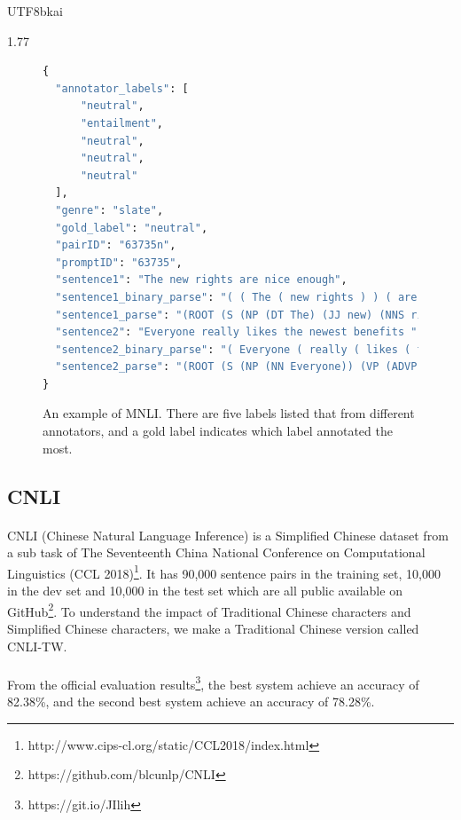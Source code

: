 \documentclass[12pt]{article}
\begin{document}
\begin{CJK*}{UTF8}{bkai}
\begin{spacing}{1.77}
\begin{figure}
\caption[An example of MNLI]{An example of MNLI. There are five labels listed that from different annotators, and a gold label indicates which label annotated the most.}
\begin{minipage}{\linewidth}
\begin{lstlisting}[language=Python]
{
  "annotator_labels": [
      "neutral",
      "entailment",
      "neutral",
      "neutral",
      "neutral"
  ],
  "genre": "slate",
  "gold_label": "neutral",
  "pairID": "63735n",
  "promptID": "63735",
  "sentence1": "The new rights are nice enough",
  "sentence1_binary_parse": "( ( The ( new rights ) ) ( are ( nice enough ) ) )",
  "sentence1_parse": "(ROOT (S (NP (DT The) (JJ new) (NNS rights)) (VP (VBP are) (ADJP (JJ nice) (RB enough)))))",
  "sentence2": "Everyone really likes the newest benefits ",
  "sentence2_binary_parse": "( Everyone ( really ( likes ( the ( newest benefits ) ) ) ) )",
  "sentence2_parse": "(ROOT (S (NP (NN Everyone)) (VP (ADVP (RB really)) (VBZ likes) (NP (DT the) (JJS newest) (NNS benefits)))))"
}
\end{lstlisting}
\end{minipage}
\end{figure}

\subsection{CNLI}
\paragraph{}
CNLI (Chinese Natural Language Inference) is a Simplified Chinese dataset from a sub task of The Seventeenth China National Conference on Computational Linguistics (CCL 2018)\footnote{http://www.cips-cl.org/static/CCL2018/index.html}. It has 90,000 sentence pairs in the training set, 10,000 in the dev set and 10,000 in the test set which are all public available on GitHub\footnote{https://github.com/blcunlp/CNLI}. To understand the impact of Traditional Chinese characters and Simplified Chinese characters, we make a Traditional Chinese version called CNLI-TW.

\paragraph{}
From the official evaluation results\footnote{https://git.io/JIlih}, the best system achieve an accuracy of 82.38\%, and the second best system achieve an accuracy of 78.28\%.


\end{spacing}
\end{CJK*}
\end{document}
